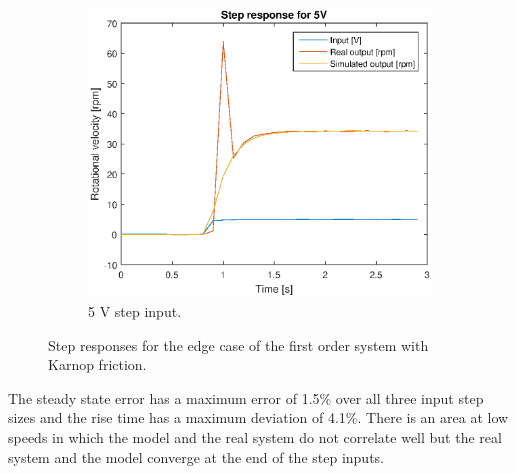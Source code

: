 \begin{figure}[H]
\begin{subfigure}[H]{0.48\textwidth}
    \includegraphics[width=\textwidth]{./img/testrig_5Vstep_no_i_fric.eps}
    \caption{5 V step input.}
    \end{subfigure}
    \caption{Step responses for the edge case of the first order system with
    Karnop friction.}
\end{figure}
The steady state error has a maximum error of 1.5\% over all three input step
sizes and the rise time has a maximum deviation of 4.1\%. There is
an area at low speeds in which the model and the real system do not correlate
well but the real system and the model converge at the end of the step inputs. 

